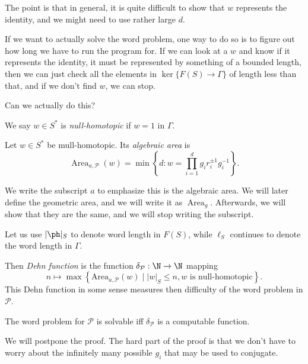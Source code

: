 \documentclass[a4paper]{article}
\DeclareMathOperator\Area{Area}
\begin{document}
The point is that in general, it is quite difficult to show that $w$ represents the identity, and we might need to use rather large $d$.

If we want to actually solve the word problem, one way to do so is to figure out how long we have to run the program for. If we can look at a $w$ and know if it represents the identity, it must be represented by something of a bounded length, then we can just check all the elements in $\ker \{F(S) \to \Gamma\}$ of length less than that, and if we don't find $w$, we can stop.

Can we actually do this?

\begin{defi}
  We say $w \in S^*$ is \emph{null-homotopic} if $w = 1$ in $\Gamma$.
\end{defi}

\begin{defi}
  Let $w \in S^*$ be mull-homotopic. Its \emph{algebraic area} is
  \[
    \Area_{a, \mathcal{P}} (w) = \min \left\{d : w = \prod_{i = 1}^d g_i r_i^{\pm 1} g_i^{-1}\right\}.
  \]
\end{defi}
We write the subscript $a$ to emphasize this is the algebraic area. We will later define the geometric area, and we will write it as $\Area_g$. Afterwards, we will show that they are the same, and we will stop writing the subscript.

Let us use $|\ph|_S$ to denote word length in $F(S)$, while $\ell_S$ continues to denote the word length in $\Gamma$.

\begin{defi}
  Then \emph{Dehn function} is the function $\delta_{\mathcal{P}}: \N \to \N$ mapping
  \[
    n \mapsto \max \left\{ \mathrm{Area}_{a, \mathcal{P}} (w) \mid |w|_S \leq n, w \text{ is null-homotopic}\right\}.
  \]
  This Dehn function in some sense measures then difficulty of the word problem in $\mathcal{P}$.
\end{defi}

\begin{prop}
  The word problem for $\mathcal{P}$ is solvable iff $\delta_{\mathcal{P}}$ is a computable function.
\end{prop}

We will postpone the proof. The hard part of the proof is that we don't have to worry about the infinitely many possible $g_i$ that may be used to conjugate.
\end{document}
